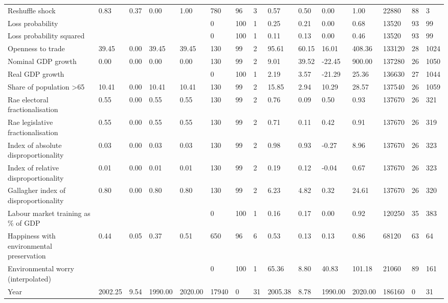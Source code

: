 \begin{longtable}{lllllllllllllll}
Reshuffle shock & 0.83 & 0.37 & 0.00 & 1.00 & 780 & 96 & 3 & 0.57 & 0.50 & 0.00 & 1.00 & 22880 & 88 & 3\\
\addlinespace
Loss probability &  &  &  &  & 0 & 100 & 1 & 0.25 & 0.21 & 0.00 & 0.68 & 13520 & 93 & 99\\
Loss probability squared &  &  &  &  & 0 & 100 & 1 & 0.11 & 0.13 & 0.00 & 0.46 & 13520 & 93 & 99\\
Openness to trade & 39.45 & 0.00 & 39.45 & 39.45 & 130 & 99 & 2 & 95.61 & 60.15 & 16.01 & 408.36 & 133120 & 28 & 1024\\
Nominal GDP growth & 0.00 & 0.00 & 0.00 & 0.00 & 130 & 99 & 2 & 9.01 & 39.52 & -22.45 & 900.00 & 137280 & 26 & 1050\\
Real GDP growth &  &  &  &  & 0 & 100 & 1 & 2.19 & 3.57 & -21.29 & 25.36 & 136630 & 27 & 1044\\
\addlinespace
Share of population >65 & 10.41 & 0.00 & 10.41 & 10.41 & 130 & 99 & 2 & 15.85 & 2.94 & 10.29 & 28.57 & 137540 & 26 & 1059\\
Rae electoral fractionalisation & 0.55 & 0.00 & 0.55 & 0.55 & 130 & 99 & 2 & 0.76 & 0.09 & 0.50 & 0.93 & 137670 & 26 & 321\\
Rae legislative fractionalisation & 0.55 & 0.00 & 0.55 & 0.55 & 130 & 99 & 2 & 0.71 & 0.11 & 0.42 & 0.91 & 137670 & 26 & 319\\
Index of absolute disproportionality & 0.03 & 0.00 & 0.03 & 0.03 & 130 & 99 & 2 & 0.98 & 0.93 & -0.27 & 8.96 & 137670 & 26 & 323\\
Index of relative disproportionality & 0.01 & 0.00 & 0.01 & 0.01 & 130 & 99 & 2 & 0.19 & 0.12 & -0.04 & 0.67 & 137670 & 26 & 323\\
\addlinespace
Gallagher index of disproportionality & 0.80 & 0.00 & 0.80 & 0.80 & 130 & 99 & 2 & 6.23 & 4.82 & 0.32 & 24.61 & 137670 & 26 & 320\\
Labour market training as \% of GDP &  &  &  &  & 0 & 100 & 1 & 0.16 & 0.17 & 0.00 & 0.92 & 120250 & 35 & 383\\
Happiness with environmental preservation & 0.44 & 0.05 & 0.37 & 0.51 & 650 & 96 & 6 & 0.53 & 0.13 & 0.13 & 0.86 & 68120 & 63 & 64\\
Environmental worry (interpolated) &  &  &  &  & 0 & 100 & 1 & 65.36 & 8.80 & 40.83 & 101.18 & 21060 & 89 & 161\\
Year & 2002.25 & 9.54 & 1990.00 & 2020.00 & 17940 & 0 & 31 & 2005.38 & 8.78 & 1990.00 & 2020.00 & 186160 & 0 & 31\\
\bottomrule
\end{longtable}
